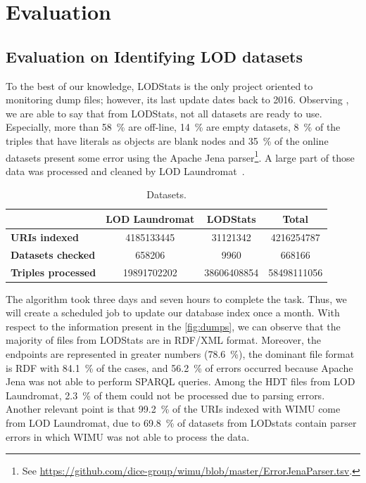 \documentclass[sw]{iosart2x}
\begin{document}
\section{Evaluation}
\label{sec:eval}

\subsection{Evaluation on Identifying LOD datasets}

To the best of our knowledge, LODStats\cite{auer2012lodstats} is the only project oriented to monitoring dump files; however, its last update dates back to 2016. 
Observing , we are able to say that from LODStats, not all datasets are ready to use.
Especially, more than \SI{58}{\percent} are off-line, \SI{14}{\percent} are empty datasets, \SI{8}{\percent} of the triples that have literals as objects are blank nodes and \SI{35}{\percent} of the online datasets present some error using the Apache Jena parser\footnote{See \url{https://github.com/dice-group/wimu/blob/master/ErrorJenaParser.tsv}.}. 
A large part of those data was processed and cleaned by LOD Laundromat~\cite{beek2014lod}.


\setlength{\tabcolsep}{0.1em} %
\begin{table}[H]
	\centering
	\caption{Datasets.}
	\label{tab:lodstats}
    \scriptsize
    \begin{tabular}{lS[table-format=11.0]S[table-format=12.0]S[table-format=12.0]} %
    \toprule
    & \textbf{LOD Laundromat} & \textbf{LODStats} & \textbf{Total} \\
    \midrule
    \textbf{URIs indexed} & 4185133445 & 31121342 & 4216254787 \\
    \textbf{Datasets checked} & 658206 & 9960 & 668166 \\
    \textbf{Triples processed} & 19891702202 & 38606408854 & 58498111056 \\
    \bottomrule
    \end{tabular}
\end{table}

The algorithm took three days and seven hours to complete the task. 
Thus, we will create a scheduled job to update our database index once a month.
With respect to the information present in the \cref{fig:dumps}, we can observe that the majority of files from LODStats are in RDF/XML format.
Moreover, the endpoints are represented in greater numbers (\SI{78.6}{\percent}), the dominant file format is RDF with \SI{84.1}{\percent} of the cases, and \SI{56.2}{\percent} of errors occurred because Apache Jena was not able to perform SPARQL queries.
Among the HDT files from LOD Laundromat, \SI{2.3}{\percent} of them could not be processed due to parsing errors.
Another relevant point is that \SI{99.2}{\percent} of the URIs indexed with WIMU come from LOD Laundromat, due to \SI{69.8}{\percent} of datasets from LODstats contain parser errors in which WIMU was not able to process the data.
\end{document}
